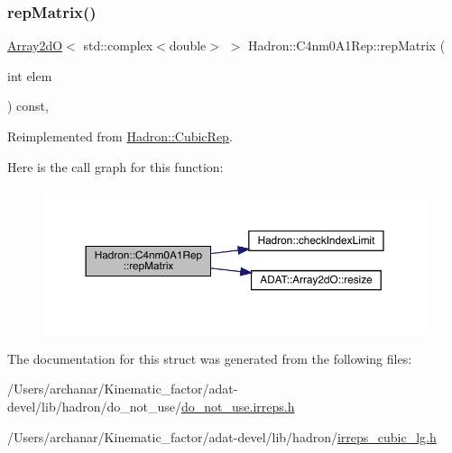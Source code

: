 \subsubsection{\texorpdfstring{repMatrix()}{repMatrix()}\hspace{0.1cm}{\footnotesize\ttfamily [3/3]}}
{\footnotesize\ttfamily \mbox{\hyperlink{classADAT_1_1Array2dO}{Array2dO}}$<$ std\+::complex$<$double$>$ $>$ Hadron\+::\+C4nm0\+A1\+Rep\+::rep\+Matrix (\begin{DoxyParamCaption}\item[{int}]{elem }\end{DoxyParamCaption}) const\hspace{0.3cm}{\ttfamily [inline]}, {\ttfamily [virtual]}}



Reimplemented from \mbox{\hyperlink{structHadron_1_1CubicRep_ac5d7e9e6f4ab1158b5fce3e4ad9e8005}{Hadron\+::\+Cubic\+Rep}}.

Here is the call graph for this function\+:
\nopagebreak
\begin{figure}[H]
\begin{center}
\leavevmode
\includegraphics[width=350pt]{d8/d28/structHadron_1_1C4nm0A1Rep_a18af771ed96478090f052459dd7a70da_cgraph}
\end{center}
\end{figure}


The documentation for this struct was generated from the following files\+:\begin{DoxyCompactItemize}
\item 
/\+Users/archanar/\+Kinematic\+\_\+factor/adat-\/devel/lib/hadron/do\+\_\+not\+\_\+use/\mbox{\hyperlink{adat-devel_2lib_2hadron_2do__not__use_2do__not__use_8irreps_8h}{do\+\_\+not\+\_\+use.\+irreps.\+h}}\item 
/\+Users/archanar/\+Kinematic\+\_\+factor/adat-\/devel/lib/hadron/\mbox{\hyperlink{adat-devel_2lib_2hadron_2irreps__cubic__lg_8h}{irreps\+\_\+cubic\+\_\+lg.\+h}}\end{DoxyCompactItemize}
